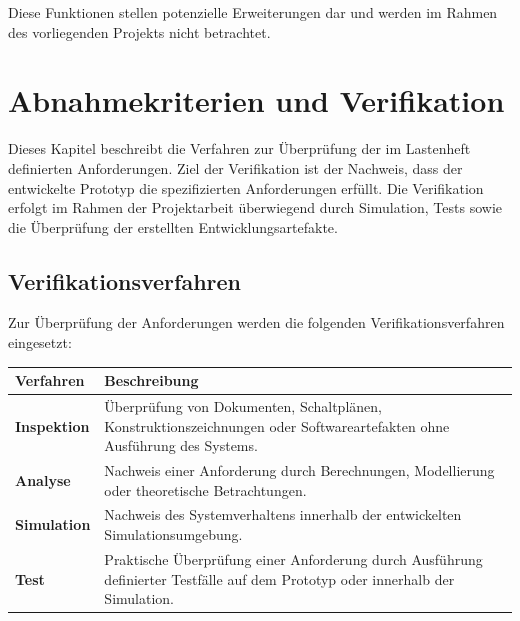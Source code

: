 Diese Funktionen stellen potenzielle Erweiterungen dar und werden im
Rahmen des vorliegenden Projekts nicht betrachtet.

\section{Abnahmekriterien und
Verifikation}\label{abnahmekriterien-und-verifikation}

Dieses Kapitel beschreibt die Verfahren zur Überprüfung der im
Lastenheft definierten Anforderungen. Ziel der Verifikation ist der
Nachweis, dass der entwickelte Prototyp die spezifizierten Anforderungen
erfüllt. Die Verifikation erfolgt im Rahmen der Projektarbeit
überwiegend durch Simulation, Tests sowie die Überprüfung der erstellten
Entwicklungsartefakte.

\subsection{Verifikationsverfahren}\label{verifikationsverfahren}

Zur Überprüfung der Anforderungen werden die folgenden
Verifikationsverfahren eingesetzt:

\begin{longtable}[]{@{}
  >{\raggedright\arraybackslash}p{}
  >{\raggedright\arraybackslash}p{}@{}}
\toprule\noalign{}
\begin{minipage}[b]{\linewidth}\raggedright
Verfahren
\end{minipage} & \begin{minipage}[b]{\linewidth}\raggedright
Beschreibung
\end{minipage} \\
\midrule\noalign{}
\endhead
\bottomrule\noalign{}
\endlastfoot
\textbf{Inspektion} & Überprüfung von Dokumenten, Schaltplänen,
Konstruktionszeichnungen oder Softwareartefakten ohne Ausführung des
Systems. \\
\textbf{Analyse} & Nachweis einer Anforderung durch Berechnungen,
Modellierung oder theoretische Betrachtungen. \\
\textbf{Simulation} & Nachweis des Systemverhaltens innerhalb der
entwickelten Simulationsumgebung. \\
\textbf{Test} & Praktische Überprüfung einer Anforderung durch
Ausführung definierter Testfälle auf dem Prototyp oder innerhalb der
Simulation. \\
\end{longtable}

